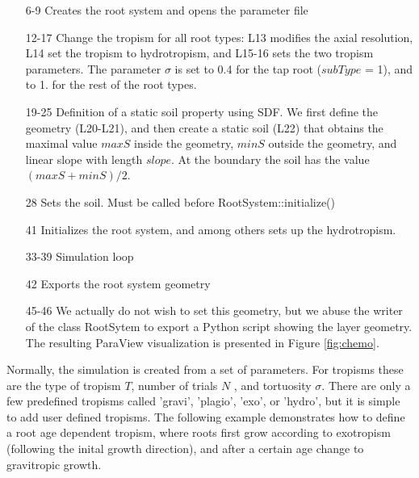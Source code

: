 \begin{itemize}

\item[6-9] Creates the root system and opens the parameter file

\item[12-17] Change the tropism for all root types: L13 modifies the axial resolution, L14 set the tropism to hydrotropism, and L15-16 sets the two tropism parameters. The parameter $\sigma$ is set to 0.4 for the tap root ($subType$ = 1), and to 1. for the rest of the root types.

\item[19-25] Definition of a static soil property using SDF. We first define the geometry (L20-L21), and then create a static soil (L22) that obtains the maximal value $maxS$ inside the geometry, 
$minS$ outside the geometry, and linear slope with length $slope$. At the boundary the soil has the value $(maxS+minS)/2$.

\item[28] Sets the soil. Must be called before RootSystem::initialize()

\item[41] Initializes the root system, and among others sets up the hydrotropism. 

\item[33-39] Simulation loop

\item[42] Exports the root system geometry

\item[45-46] We actually do not wish to set this geometry, but we abuse the writer of the class RootSytem to export a Python script showing the layer geometry. The resulting ParaView visualization is presented in Figure \ref{fig:chemo}.

\end{itemize}


Normally, the simulation is created from a set of parameters. For tropisms these are the type of tropism $T$, number of trials $N$ , and tortuosity $\sigma$. There are only a few predefined tropisms called 'gravi', 'plagio', 'exo', or 'hydro', but it is simple to add user defined tropisms.
The following example demonstrates how to define a root age dependent tropism, where roots first grow according to exotropism (following the inital growth direction), and after a certain age change to gravitropic growth.

